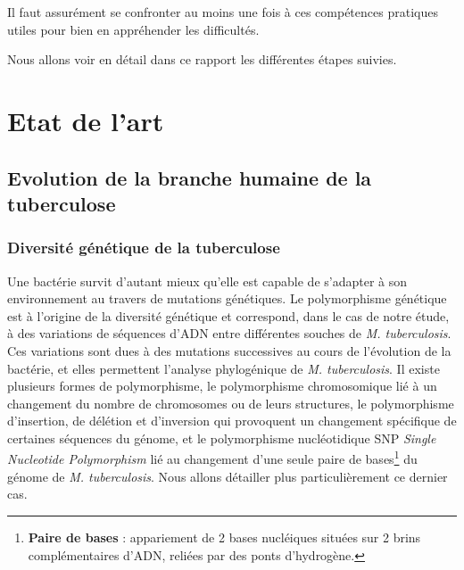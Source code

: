 \documentclass[twoside,a4paper,11pt,frenchb,openany]{report}
\begin{document}
Il faut assurément se confronter au moins une fois à ces compétences pratiques utiles pour bien en appréhender les difficultés.

Nous allons voir en détail dans ce rapport les différentes étapes suivies.





\chapter{Etat de l'art}



\section{Evolution de la branche humaine de la tuberculose}


\subsection{Diversité génétique de la tuberculose}

Une bactérie survit d'autant mieux qu'elle est capable de s'adapter à son environnement au travers de mutations génétiques. Le polymorphisme génétique est à l'origine de la diversité génétique et correspond, dans le cas de notre étude, à des variations de séquences d'ADN entre différentes souches de \textit{M. tuberculosis}. Ces variations sont dues à des mutations successives au cours de l'évolution de la bactérie, et elles permettent l'analyse phylogénique de \textit{M. tuberculosis}. Il existe plusieurs formes de polymorphisme, le polymorphisme chromosomique lié à un changement du nombre de chromosomes ou de leurs structures, le polymorphisme d'insertion, de délétion et d'inversion qui provoquent un changement spécifique de certaines séquences du génome, et le polymorphisme nucléotidique SNP \textit{Single Nucleotide Polymorphism} lié au changement d'une seule paire de bases\footnote{\textbf{Paire de bases} : appariement de 2 bases nucléiques situées sur 2 brins complémentaires d'ADN, reliées par des ponts d'hydrogène.} du génome de \textit{M. tuberculosis}. Nous allons détailler plus particulièrement ce dernier cas.
\end{document}
